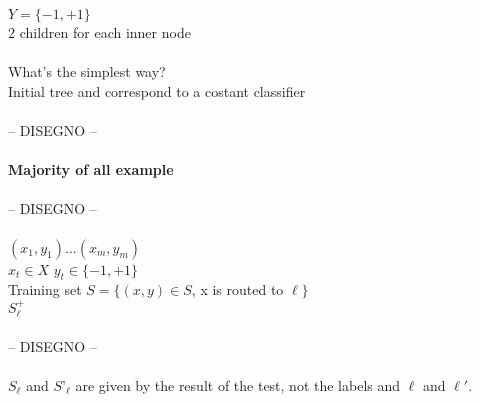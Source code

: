 \documentclass[../main.tex]{subfiles}
\begin{document}
$ Y = \{-1, +1 \}$
\\ $2$ children for each inner node
\\\\
What's the simplest way?\\
Initial tree and correspond to a costant classifier
\\\\
-- DISEGNO --
\\\\
\textbf{Majority of all example}
\\\\
-- DISEGNO --
\\\\
$(x_1, y_1) ... (x_m, y_m)$ \\
$ x_t \in X$ \qquad $ y_t \in \{-1,+1\}$\\
Training set $S = \{ (x,y) \in S$, x is routed to $\ell\}$\\
$S_{\ell}^+$ 
\\\\
-- DISEGNO --
\\\\
$ S_{\ell}$ and $ S’_{\ell}$ are given by the result of the test, not the labels  and $\ell$ and $\ell'$.
\end{document}
